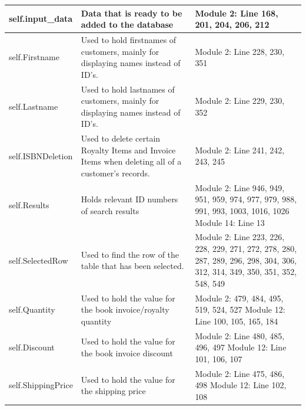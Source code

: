 \begin{center}
\begin{tabular}{|p{3cm}|p{4cm}|p{3cm}|}
    \hline
    self.input\_data & Data that is ready to be added to the database & Module 2: Line 168, 201, 204, 206, 212 \\ \hline
    self.Firstname & Used to hold firstnames of customers, mainly for displaying names instead of ID's. & Module 2: Line 228, 230, 351 \\ \hline
    self.Lastname & Used to hold lastnames of customers, mainly for displaying names instead of ID's. & Module 2: Line 229, 230, 352 \\ \hline
    self.ISBNDeletion & Used to delete certain Royalty Items and Invoice Items when deleting all of a customer's records. & Module 2: Line 241, 242, 243, 245 \\ \hline
    self.Results & Holds relevant ID numbers of search results & Module 2: Line 946, 949, 951, 959, 974, 977, 979, 988, 991, 993, 1003, 1016, 1026 \newline Module 14: Line 13 \\ \hline
    self.SelectedRow & Used to find the row of the table that has been selected. & Module 2: Line 223, 226, 228, 229, 271, 272, 278, 280, 287, 289, 296, 298, 304, 306, 312, 314, 349, 350, 351, 352, 548, 549 \\ \hline
    self.Quantity & Used to hold the value for the book invoice/royalty quantity & Module 2: 479, 484, 495, 519, 524, 527 \newline Module 12: Line 100, 105, 165, 184 \\ \hline
    self.Discount & Used to hold the value for the book invoice discount & Module 2: Line 480, 485, 496, 497 \newline Module 12: Line 101, 106, 107 \\ \hline
    self.ShippingPrice & Used to hold the value for the shipping price & Module 2: Line 475, 486, 498 \newline Module 12: Line 102, 108 \\ \hline
    \hline
\end{tabular}
\end{center}

